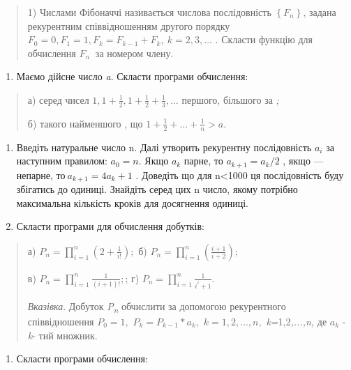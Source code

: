\documentclass[]{article}
\begin{document}
\begin{quote}
1) Числами Фібоначчі називається числова послідовність
\(\left\{ F_{n} \right\}\), задана рекурентним співвідношенням другого
порядку
\(F_{0} = 0,F_{1} = 1,F_{k} = F_{k - 1} + F_{k},\ k = 2,3,\ldots\) .
Скласти функцію для обчислення \(F_{n}\ \) за номером члену.
\end{quote}

\begin{enumerate}
\def\labelenumi{\arabic{enumi})}
\item
  Маємо дійсне число \emph{a}. Скласти програми обчислення:
\end{enumerate}

\begin{quote}
а) серед чисел
\(1,1 + \frac{1}{2},1 + \frac{1}{2} + \frac{1}{3},\ldots\) першого,
більшого за \emph{;}

б) такого найменшого , що
\(1 + \frac{1}{2} + \ldots + \frac{1}{n} > a.\)
\end{quote}

\begin{enumerate}
\def\labelenumi{\arabic{enumi})}
\item
  Введіть натуральне число n. Далі утворить рекурентну послідовність
  \(a_{i}\) за наступним правилом: \(a_{0} = n\). Якщо \(a_{k}\) парне,
  то \(a_{k + 1} = a_{k}/2\) , якщо --- непарне,
  то\(\ a_{k + 1} = 4a_{k} + 1\) . Доведіть що для n\textless{}1000 ця
  послідовність буду збігатись до одиниці. Знайдіть серед цих n число,
  якому потрібно максимальна кількість кроків для досягнення одиниці.
\item
  Скласти програми для обчислення добутків:
\end{enumerate}

\begin{quote}
а) \(P_{n} = \prod_{i = 1}^{n}\left( 2 + \frac{1}{i!} \right);\) б)
\(P_{n} = \prod_{i = 1}^{n}\left( \frac{i + 1}{i + 2} \right);\)

в) \(P_{n} = \prod_{i = 1}^{n}\frac{1}{(i + 1)!};\); г)
\(P_{n} = \prod_{i = 1}^{n}\frac{1}{i^{i} + 1}.\)

\emph{\emph{Вказівка}}. Добуток \emph{P\textsubscript{n}} обчислити за
допомогою рекурентного співвідношення \(P_{0} = 1,\)
\(P_{k} = P_{k - 1}*a_{k},\) \(k = 1,2,\ldots,n,\)
\emph{k=}1,2\emph{,...,n,} де \(a_{k}\) - \emph{k}- тий множник.
\end{quote}

\begin{enumerate}
\def\labelenumi{\arabic{enumi})}
\item
  Скласти програми обчислення:
\end{enumerate}
\end{document}
